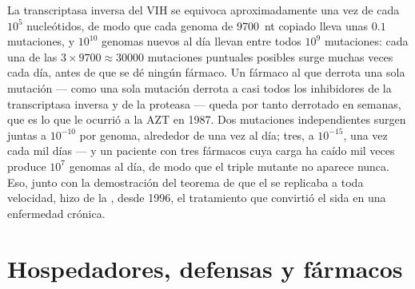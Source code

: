 \begin{example}\label{ex:b3:virology:three-drugs}
La transcriptasa inversa del VIH se equivoca aproximadamente una vez de
cada $10^{5}$ nucleótidos, de modo que cada genoma de \qty{9700}{nt}
copiado lleva unas $0.1$ mutaciones, y $10^{10}$ genomas nuevos al día
llevan entre todos $10^{9}$ mutaciones: cada una de las
$3\times 9700 \approx \num{30000}$ mutaciones puntuales posibles surge
muchas veces cada día, antes de que se dé ningún fármaco. Un fármaco al
que derrota una sola mutación --- como una sola mutación derrota a casi
todos los inhibidores de la transcriptasa inversa y de la proteasa ---
queda por tanto derrotado en semanas, que es lo que le ocurrió a la AZT
en 1987. Dos mutaciones independientes surgen juntas a $10^{-10}$ por
genoma, alrededor de una vez al día; tres, a $10^{-15}$, una vez cada mil
días --- y un paciente con tres fármacos cuya carga ha caído mil veces
produce $10^{7}$ genomas al día, de modo que el triple mutante no aparece
nunca. Eso, junto con la demostración del teorema de que el  se
replicaba a toda velocidad, hizo de la , desde 1996, el
tratamiento que convirtió el sida en una enfermedad crónica.
\end{example}

\section{Hospedadores, defensas y fármacos}

